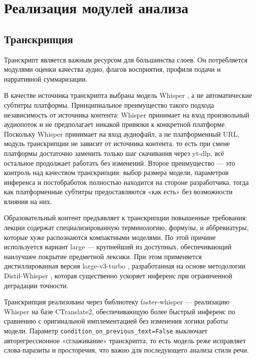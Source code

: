 \section{Реализация модулей анализа}
\label{sec:methodology}


\subsection{Транскрипция}

Транскрипт является важным ресурсом для большинства слоев. Он потребляется модулями оценки
качества аудио, флагов восприятия, профиля подачи и нарративной суммаризации.

В качестве источника транскрипта выбрана модель Whisper \cite{radford2022whisper},
а не автоматические субтитры платформы.
Принципиальное преимущество такого подхода независимость от источника контента:
Whisper принимает на вход произвольный аудиопоток и не предполагает
никакой привязки к конкретной платформе.
Поскольку Whisper принимает на вход аудиофайл, а не платформенный URL, модуль транскрипции не зависит от источника контента, то есть 
при смене платформы достаточно заменить только шаг скачивания через yt-dlp, всё остальное продолжает работать без изменений.
Второе преимущество — это контроль над качеством транскрипции:
выбор размера модели, параметров инференса и постобработок
полностью находится на стороне разработчика, тогда как платформенные субтитры
предоставляются «как есть» без возможности влияния на них.

Образовательный контент предъявляет к транскрипции повышенные требования:
лекции содержат специализированную терминологию, формулы, и аббревиатуры, которые хуже распознаются компактными моделями.
По этой причине используется вариант large — крупнейший из доступных,
обеспечивающий наилучшее покрытие предметной лексики.
При этом применяется дистиллированная версия large-v3-turbo \cite{openai2024whisperturbo},
разработанная на основе методологии Distil-Whisper \cite{gandhi2023distilwhisper}, которая
существенно ускоряет инференс при ограниченной деградации точности.

Транскрипция реализована через библиотеку faster-whisper \cite{systran2022fasterwhisper} —
реализацию Whisper на базе CTranslate2, обеспечивающую более быстрый инференс
по сравнению с оригинальной имплементацией без изменения логики работы модели.
Параметр \texttt{condition\_on\_previous\_text=False} выключает авторегрессионное
«сглаживание» транскрипта, то есть модель реже исправляет слова-паразиты и просторечия,
что важно для последующего анализа стиля речи.


